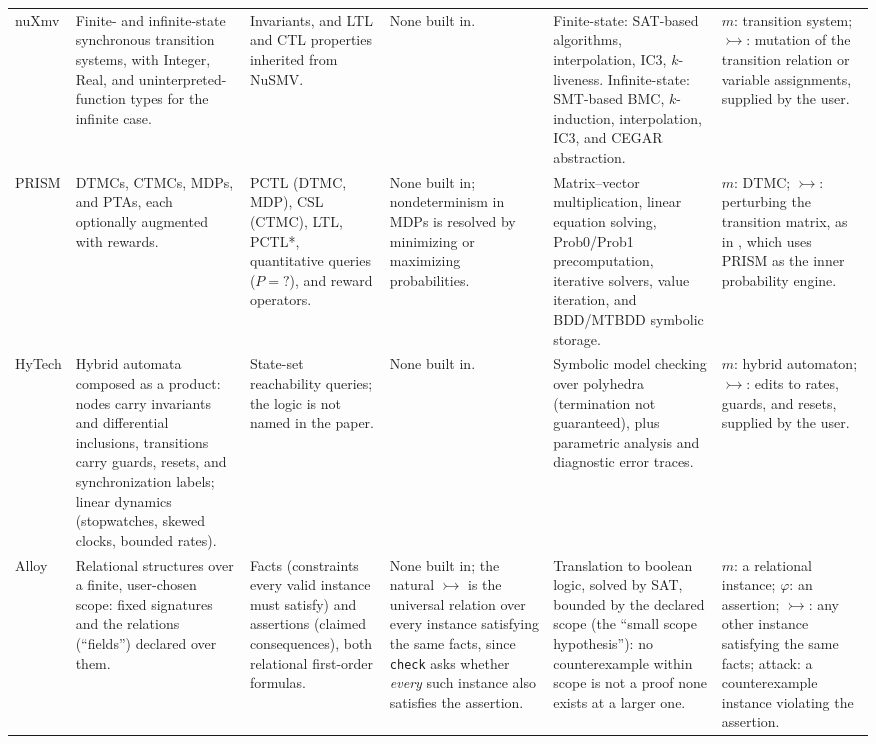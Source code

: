 \documentclass[11pt]{amsart}
\theoremstyle{definition}
\theoremstyle{remark}
\newcommand{\adv}{\rightarrowtail}   %
\begin{document}
\begin{landscape}
\begin{longtable}{L{1.7cm} L{4.0cm} L{3.5cm} L{4.2cm} L{4.4cm} L{3.6cm}}
\addlinespace
nuXmv \cite{nuxmv} &
Finite- and infinite-state synchronous transition systems, with Integer, Real, and
uninterpreted-function types for the infinite case. &
Invariants, and LTL and CTL properties inherited from NuSMV. &
None built in. &
Finite-state: SAT-based algorithms, interpolation, IC3, $k$-liveness. Infinite-state: SMT-based
BMC, $k$-induction, interpolation, IC3, and CEGAR abstraction. &
$m$: transition system; $\adv$: mutation of the transition relation or variable assignments, supplied by the user. \\
\addlinespace
PRISM \cite{prism} &
DTMCs, CTMCs, MDPs, and PTAs, each optionally augmented with rewards. &
PCTL (DTMC, MDP), CSL (CTMC), LTL, PCTL*, quantitative queries ($P{=}?$), and reward operators. &
None built in; nondeterminism in MDPs is resolved by minimizing or maximizing probabilities. &
Matrix--vector multiplication, linear equation solving, Prob0/Prob1 precomputation, iterative
solvers, value iteration, and BDD/MTBDD symbolic storage. &
$m$: DTMC; $\adv$: perturbing the transition matrix, as in \cite{oakley}, which uses PRISM as the inner probability engine. \\
\addlinespace
HyTech \cite{hytech} &
Hybrid automata composed as a product: nodes carry invariants and differential inclusions,
transitions carry guards, resets, and synchronization labels; linear dynamics (stopwatches, skewed
clocks, bounded rates). &
State-set reachability queries; the logic is not named in the paper. &
None built in. &
Symbolic model checking over polyhedra (termination not guaranteed), plus parametric analysis and
diagnostic error traces. &
$m$: hybrid automaton; $\adv$: edits to rates, guards, and resets, supplied by the user. \\
\addlinespace
Alloy \cite{alloy} &
Relational structures over a finite, user-chosen scope: fixed signatures and the relations
(``fields'') declared over them. &
Facts (constraints every valid instance must satisfy) and assertions (claimed consequences),
both relational first-order formulas. &
None built in; the natural $\adv$ is the universal relation over every instance satisfying the
same facts, since \texttt{check} asks whether \emph{every} such instance also satisfies the assertion. &
Translation to boolean logic, solved by SAT, bounded by the declared scope (the ``small scope
hypothesis''): no counterexample within scope is not a proof none exists at a larger one. &
$m$: a relational instance; $\varphi$: an assertion; $\adv$: any other instance satisfying the same facts;
attack: a counterexample instance violating the assertion. \\

\end{longtable}
\end{landscape}
\end{document}
